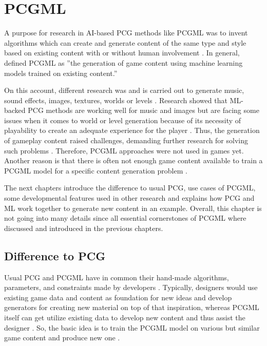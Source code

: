 \documentclass[MGS,Master,english]{twbook}%
\begin{document}
%
%
\clearpage
\chapter{\acl{PCGML}}
A purpose for research in AI-based PCG methods like PCGML was to invent algorithms which can create and generate content of the same type and style based on existing content with or without human involvement \cite{ai::book} \cite{pcgml::paper}. In general, \citep{pcgml::paper} defined PCGML as ''the generation of game content using machine learning models trained on existing content.'' 

On this account, different research was and is carried out to generate music, sound effects, images, textures, worlds or levels \cite{ai::book}. Research showed that ML-backed PCG methods are working well for music and images but are facing some issues when it comes to world or level generation because of its necessity of playability to create an adequate experience for the player \cite{ai::book}. Thus, the generation of gameplay content raised challenges, demanding further research for solving such problems \cite{ai::book}. Therefore, PCGML approaches were not used in games yet. Another reason is that there is often not enough game content available to train a PCGML model for a specific content generation problem \cite{ai::book}. 

The next chapters introduce the difference to usual PCG, use cases of PCGML, some developmental features used in other research and explains how PCG and ML work together to generate new content in an example. Overall, this chapter is not going into many details since all essential cornerstones of PCGML where discussed and introduced in the previous chapters.

\section{Difference to \acl{PCG}}
Usual PCG and PCGML have in common their hand-made algorithms, parameters, and constraints made by developers \cite{pcgml::paper}. Typically, designers would use existing game data and content as foundation for new ideas and develop generators for creating new material on top of that inspiration, whereas PCGML itself can get utilize existing data to develop new content and thus assist the designer \cite{pcgml::paper}. So, the basic idea is to train the PCGML model on various but similar game content and produce new one \cite{pcgml::paper}. 
\end{document}
